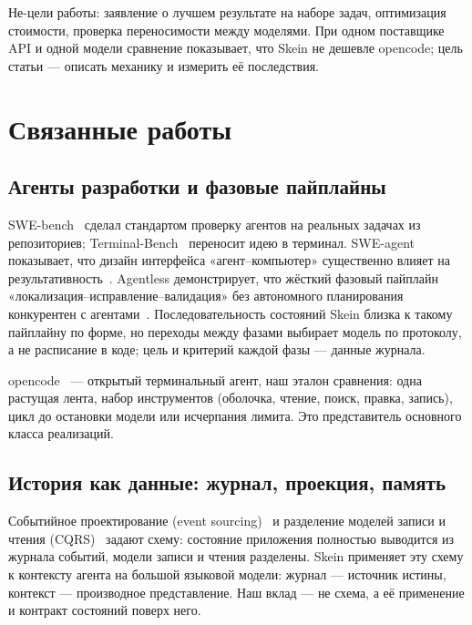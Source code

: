 \documentclass[11pt,a4paper]{article}
\begin{document}
Не-цели работы: заявление о лучшем результате на наборе задач, оптимизация стоимости,
проверка переносимости между моделями. При одном поставщике API и одной модели сравнение
показывает, что Skein не дешевле opencode; цель статьи --- описать механику и измерить её
последствия.

\section{Связанные работы}

\subsection{Агенты разработки и фазовые пайплайны}

SWE-bench~\cite{jimenez2024swebench} сделал стандартом проверку агентов на реальных задачах
из репозиториев; Terminal-Bench~\cite{terminalbench} переносит идею в терминал. SWE-agent
показывает, что дизайн интерфейса «агент--компьютер» существенно влияет на
результативность~\cite{yang2024sweagent}. Agentless демонстрирует, что жёсткий фазовый
пайплайн «локализация--исправление--валидация» без автономного планирования конкурентен с
агентами~\cite{xia2024agentless}. Последовательность состояний Skein близка к такому
пайплайну по форме, но переходы между фазами выбирает модель по протоколу, а не
расписание в коде; цель и критерий каждой фазы --- данные журнала.

opencode~\cite{opencode} --- открытый терминальный агент, наш эталон сравнения: одна
растущая лента, набор инструментов (оболочка, чтение, поиск, правка, запись), цикл до
остановки модели или исчерпания лимита. Это представитель основного класса реализаций.

\subsection{История как данные: журнал, проекция, память}

Событийное проектирование (event sourcing)~\cite{fowler2005event} и разделение моделей записи и чтения (CQRS)~\cite{fowler2011cqrs} задают схему:
состояние приложения полностью выводится из журнала событий, модели записи и чтения
разделены. Skein применяет эту схему к контексту агента на большой языковой модели: журнал ---
источник истины, контекст --- производное представление. Наш вклад --- не схема, а её
применение и контракт состояний поверх него.
\end{document}
